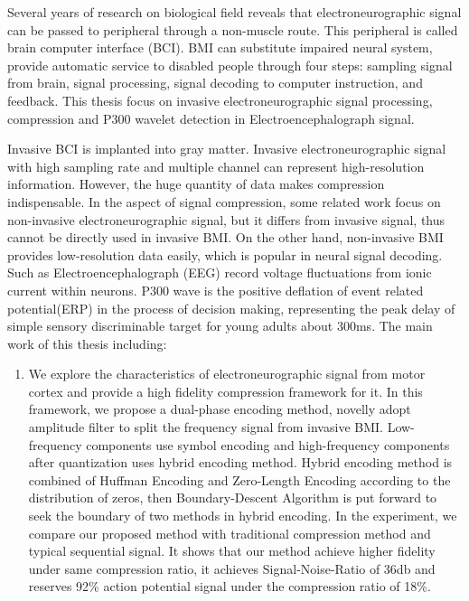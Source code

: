 \begin{englishabstract}

Several years of research on biological field reveals that electroneurographic signal can be passed to peripheral through a non-muscle route. This peripheral is called brain computer interface (BCI). BMI can substitute impaired neural system, provide automatic service to disabled people through four steps: sampling signal from brain, signal processing, signal decoding to computer instruction, and feedback. This thesis focus on invasive electroneurographic signal processing, compression and P300 wavelet detection in Electroencephalograph signal. 

Invasive BCI is implanted into gray matter. Invasive electroneurographic signal with high sampling rate and multiple channel can represent high-resolution information. However, the huge quantity of data makes compression indispensable. 
In the aspect of signal compression, some related work focus on non-invasive electroneurographic signal, but it differs from invasive signal, thus cannot be directly used in invasive BMI. On the other hand, non-invasive BMI provides low-resolution data easily, which is popular in  neural signal decoding. Such as Electroencephalograph 
(EEG) record voltage fluctuations from ionic current within neurons. P300 wave is the positive deflation of event related potential(ERP) in the process of decision making, representing the peak delay of simple sensory discriminable target for young adults about 300ms. The main work of this thesis including: 
\begin{enumerate}

\item We explore the characteristics of electroneurographic signal from motor cortex and provide a high fidelity compression framework for it. In this framework, we propose a dual-phase encoding method,  novelly adopt amplitude filter to split the frequency signal from invasive BMI. Low-frequency components use symbol encoding and high-frequency components after quantization uses hybrid encoding method. Hybrid encoding method is combined of Huffman Encoding and Zero-Length Encoding according to the distribution of zeros, then Boundary-Descent Algorithm is put forward to seek the boundary of two methods in hybrid encoding. In the experiment, we compare our proposed method with traditional compression method and typical sequential signal. It shows that our method achieve higher fidelity under same compression ratio, it achieves Signal-Noise-Ratio of 36db and reserves 92\% action potential signal under the compression ratio of 18\%.


\end{enumerate}
\end{englishabstract}
